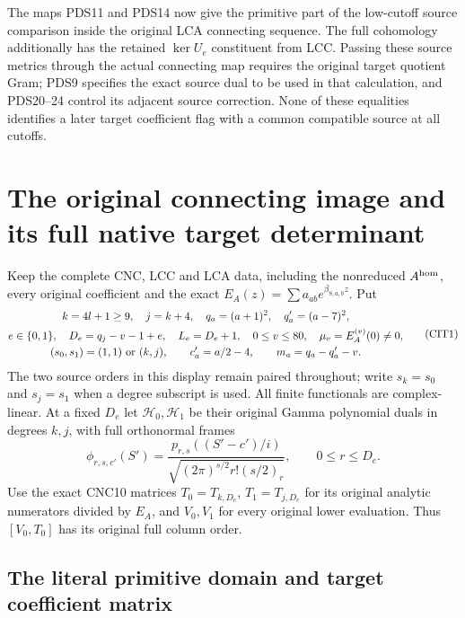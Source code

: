\documentclass[10pt]{article}
\begin{document}
The maps PDS11 and PDS14 now give the primitive part of the
low-cutoff source comparison inside the original LCA connecting
sequence. The full cohomology additionally has the retained
$\ker U_e$ constituent from LCC. Passing these source metrics
through the actual connecting map requires the original target
quotient Gram; PDS9 specifies the exact source dual to be used
in that calculation, and PDS20--24 control its adjacent source
correction. None of these equalities identifies a later target
coefficient flag with a common compatible source at all cutoffs.


\section{The original connecting image and its full native target determinant}
\label{sec:CIT}
Keep the complete CNC, LCC and LCA data, including the nonreduced
$A^{\rm hom}$, every original coefficient and the exact
$E_A(z)=\sum a_{ab}e^{\beta_{8,a,b}z}$. Put
\[
 \begin{gathered}
 k=4l+1\ge9,\quad j=k+4,\quad q_a=(a+1)^2,\quad q'_a=(a-7)^2,\\
 e\in\{0,1\},\quad D_e=q_j-v-1+e,\quad L_e=D_e+1,\quad
 0\le v\le80,\quad\mu_v=E_A^{(v)}(0)\ne0,\\
 (s_0,s_1)=(1,1)\ \hbox{or}\ (k,j),\qquad
 c'_a=a/2-4,\qquad m_a=q_a-q'_a-v .
 \end{gathered}\tag{CIT1}
\]
The two source orders in this display remain paired throughout;
write $s_k=s_0$ and $s_j=s_1$ when a degree subscript is used.
All finite functionals are complex-linear. At a fixed $D_e$ let
$\mathcal H_0,\mathcal H_1$ be their original Gamma polynomial
duals in degrees $k,j$, with full orthonormal frames
\[
 \phi_{r,s,c'}(S')=
 \frac{p_{r,s}((S'-c')/i)}
      {\sqrt{(2\pi)^{s/2}r!(s/2)_r}},\qquad 0\le r\le D_e .
 \tag{CIT2}
\]
Use the exact CNC10 matrices $T_0=T_{k,D_e}$, $T_1=T_{j,D_e}$
for its original analytic numerators divided by $E_A$, and
$V_0,V_1$ for every original lower evaluation. Thus
$[V_0,T_0]$ has its original full column order.

\subsection{The literal primitive domain and target coefficient matrix}
\end{document}
